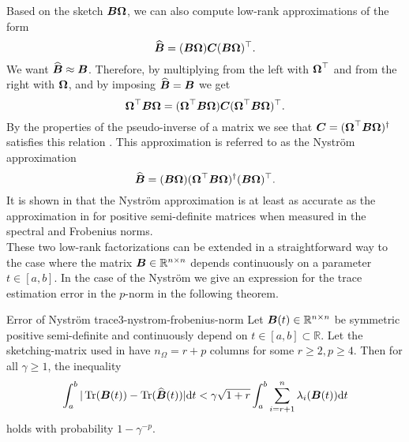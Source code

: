 Based on the sketch $\boldsymbol{B}\boldsymbol{\Omega}$, we can also compute low-rank approximations
of the form
\begin{equation}
    \widehat{\boldsymbol{B}} = (\boldsymbol{B} \boldsymbol{\Omega}) \boldsymbol{C} (\boldsymbol{B} \boldsymbol{\Omega})^{\top}.
    \label{equ:3-nystrom-nystrom-general}
\end{equation}
We want $\widehat{\boldsymbol{B}} \approx \boldsymbol{B}$. Therefore, by multiplying 
from the left with $\boldsymbol{\Omega}^{\top}$ and from the right with $\boldsymbol{\Omega}$,
and by imposing $\widehat{\boldsymbol{B}} = \boldsymbol{B}$ we get
\begin{equation}
    \boldsymbol{\Omega}^{\top} \boldsymbol{B} \boldsymbol{\Omega} = (\boldsymbol{\Omega}^{\top} \boldsymbol{B} \boldsymbol{\Omega}) \boldsymbol{C} (\boldsymbol{\Omega}^{\top} \boldsymbol{B} \boldsymbol{\Omega})^{\top}.
    \label{equ:3-nystrom-nystrom-unknown}
\end{equation}
By the properties of the pseudo-inverse of a matrix we see that
$\boldsymbol{C} = (\boldsymbol{\Omega}^{\top} \boldsymbol{B} \boldsymbol{\Omega})^{\dagger}$ satisfies this
relation \cite[section~3.1]{lin2017randomized}.
This approximation is referred to as the Nystr\"om approximation \cite{gittens2013nystrom,lin2017randomized}
\begin{equation}
    \widehat{\boldsymbol{B}} = (\boldsymbol{B} \boldsymbol{\Omega}) (\boldsymbol{\Omega}^{\top} \boldsymbol{B} \boldsymbol{\Omega})^{\dagger} (\boldsymbol{B} \boldsymbol{\Omega})^{\top}.
    \label{equ:3-nystrom-nystrom}
\end{equation}
It is shown in \cite[lemma~5.2]{tropp2023randomized} that the Nystr\"om approximation
is at least as accurate as the approximation in 
for positive semi-definite matrices when measured in the spectral
and Frobenius norms.\\

These two low-rank factorizations can be extended in a straightforward way
to the case where the matrix $\boldsymbol{B} \in \mathbb{R}^{n \times n}$ depends
continuously on a parameter $t \in [a, b]$. In the case of the Nystr\"om
we give an expression for the trace estimation error in the $p$-norm in the
following theorem.
\begin{theorem}{Error of Nystr\"om trace}{3-nystrom-frobenius-norm}
    Let $\boldsymbol{B}(t) \in \mathbb{R}^{n \times n}$ be symmetric positive semi-definite
    and continuously depend on $t \in [a,b] \subset \mathbb{R}$. Let the \gls{sketching-matrix}
    used in  have
    $n_{\Omega} = r + p$ columns for some $r \geq 2, p \geq 4$. Then
    for all $\gamma \geq 1$, the inequality
    \begin{equation}
        \int_{a}^{b} | \operatorname{Tr}(\boldsymbol{B}(t)) - \operatorname{Tr}(\widehat{\boldsymbol{B}}(t))| \mathrm{d}t
            < \gamma \sqrt{1 + r} \int_{a}^{b} \sum_{i = r+1}^n \lambda_i(\boldsymbol{B}(t)) \mathrm{d}t
    \end{equation}
    holds with probability $1 - \gamma^{-p}$.
\end{theorem}

